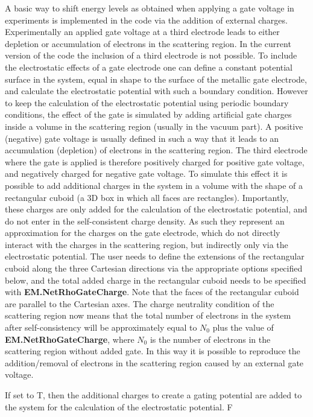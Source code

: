 \documentclass[11pt]{article}
\begin{document}
A basic way to shift energy levels as obtained when applying a gate voltage in experiments is implemented in the code via the addition of external charges. Experimentally an applied gate voltage at a third electrode leads to either depletion or accumulation of electrons in the scattering region. In the current version of the code the inclusion of a third electrode is not possible. To include the electrostatic effects of a gate electrode one can define a constant potential surface in the system, equal in shape to the surface of the metallic gate electrode, and calculate the electrostatic potential with such a boundary condition. However to keep the calculation of the electrostatic potential using periodic boundary conditions, the effect of the gate is simulated by adding artificial gate charges inside a volume in the scattering region (usually in the vacuum part). A positive (negative) gate voltage is usually defined in such a way that it leads to an accumulation (depletion) of electrons in the scattering region. The third electrode where the gate is applied is therefore positively charged for positive gate voltage, and negatively charged for negative gate voltage. To simulate this effect it is possible to add additional charges in the system in a volume with the shape of a rectangular cuboid (a 3D box in which all faces are rectangles). Importantly, these charges are only added for the calculation of the electrostatic potential, and do not enter in the self-consistent charge density. As such they represent an approximation for the charges on the gate electrode, which do not directly interact with the charges in the scattering region, but indirectly only via the electrostatic potential. The user needs to define the extensions of the rectangular cuboid along the three Cartesian directions via the appropriate options specified below, and the total added charge in the rectangular cuboid needs to be specified with {\bf EM.NetRhoGateCharge}. Note that the faces of the rectangular cuboid are parallel to the Cartesian axes. The charge neutrality condition of the scattering region now means that the total number of electrons in the system after self-consistency will be approximately equal to $N_0$ plus the value of {\bf EM.NetRhoGateCharge}, where $N_0$ is the number of electrons in the scattering region without added gate. In this way it is possible to reproduce the addition/removal of electrons in the scattering region caused by an external gate voltage.

\vspace{0.5cm}
{If set to T, then the additional charges to create a gating potential are added to the system for the calculation of the electrostatic potential.}
{F}
\end{document}
